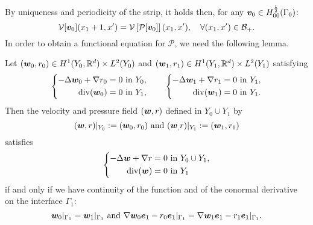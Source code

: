 \documentclass[a4paper,10pt,reqno]{amsart}
\begin{document}
By uniqueness and periodicity of the strip, it holds then, for any ${\bm v}_0\in
H^{\frac{1}{2}}_{00}(\Gamma_0)$: 
\begin{equation}
\label{eqn:o0rih}
    \mathcal{V}[{\bm v}_0](x_1+1,x')=\mathcal{V}\left[\mathcal{P}[{\bm v}_0]\right](x_1,x'),\quad
    \forall (x_1,x')\in \mathcal{B}_+.
\end{equation}
In order to obtain a functional equation for $\mathcal{P}$, we need the following
lemma.
\begin{lemma}
    \label{lem:3a1i0}
    Let $({\bm w}_0,r_0)\in H^{1}(Y_0,\mathbb{R}^{d})\times L^{2}(Y_0)$ and $({\bm w}_1,r_1)\in
    H^{1}(Y_1,\mathbb{R}^{d})\times L^{2}(Y_1)$ satisfying  
    \begin{equation}
    \label{eqn:he7zb}   
    \left\{\begin{aligned}
            -\Delta {\bm w}_0+\nabla r_0 &=0 \textrm{ in } Y_0,\\  
            \mathrm{div}({\bm w}_0) &= 0\textrm{ in } Y_1,
    \end{aligned}\right. \qquad
    \left\{\begin{aligned}
            -\Delta {\bm w}_1+\nabla r_1 &=0 \textrm{ in } Y_1,\\  
            \mathrm{div}({\bm w}_1) &= 0\textrm{ in } Y_1.
    \end{aligned}\right.
    \end{equation}
    Then the velocity and pressure field $({\bm w},r)$ defined in $Y_0\cup Y_1$ by   
    \begin{equation}
    \label{eqn:topkr}
        ({\bm w},r)|_{Y_0}:=({\bm w}_0,r_0) \text{ and }({\bm w}_,r)|_{Y_1}:=({\bm w}_1,r_1)
    \end{equation}
    satisfies   
    \begin{equation}
    \label{eqn:s9bzn}   
    \left\{\begin{aligned}
            -\Delta {\bm w}+\nabla r&=0\textrm{ in } Y_0\cup Y_1,\\    
            \mathrm{div}({\bm w})& = 0 \textrm{ in } Y_1
    \end{aligned}
    \right.
    \end{equation}
    if and only if we have continuity of the function and of the conormal derivative
    on the interface $\Gamma_1$:
    \begin{equation}
    \label{eqn:8zwjf}
    {\bm w}_0|_{\Gamma_1}={\bm w}_1|_{\Gamma_1} \text{ and
    }\nabla{\bm w}_0{\bm e}_1-r_0{\bm e}_1\vert_{\Gamma_1}=\nabla {\bm w}_1{\bm e}_1-r_1{\bm e}_1\vert_{\Gamma_1}.
    \end{equation}
\end{lemma}
\end{document}
